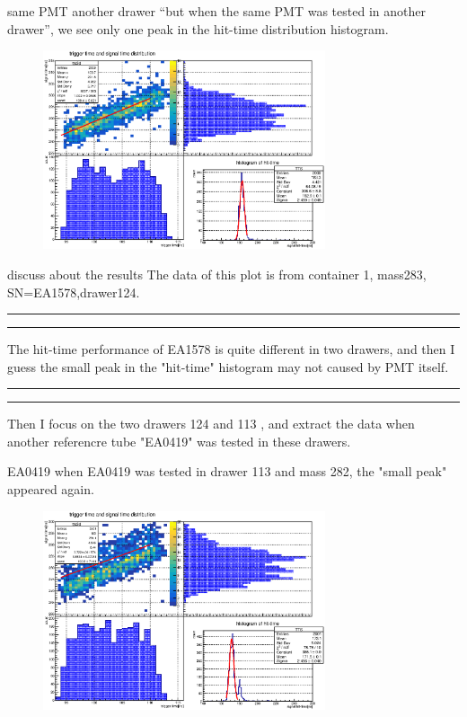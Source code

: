 \documentclass[11pt,compress,xcolor=x11names,UTF8]{beamer}
\begin{document}
\begin{frame}{same PMT another drawer}
	\alert{“but when the same PMT was tested in another drawer”, we see only one peak in the hit-time distribution histogram.}
\begin{figure}
\centering
\includegraphics[width=0.74\textwidth]{ea1578-283} %
\end{figure}
\end{frame}
\begin{frame}{discuss about the results}
The data of this plot is from container 1, mass283, SN=EA1578,drawer124.\\
\vspace{.5cm}
\hrule{}
\hrule{}
\vspace{.5cm}

The hit-time performance of EA1578 is quite different in two drawers, and then I guess the small peak in the "hit-time" histogram may not caused by PMT itself.
\vspace{.5cm}
\hrule{}
\hrule{}
\vspace{.5cm}
Then I focus on the two drawers 124 and 113 , and extract the data when another referencre tube "EA0419" was tested in these drawers.
\end{frame}
\begin{frame}{EA0419}
when EA0419 was tested in drawer 113 and mass 282, the "small peak" appeared again.
\begin{figure}
\centering
\includegraphics[width=0.74\textwidth]{ea0419-282} %
\end{figure}
\end{frame}
\end{document}
